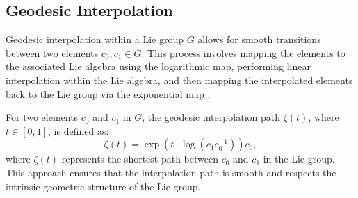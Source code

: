 \subsection{Geodesic Interpolation}
\label{subsec:geodesic-interpolation}

Geodesic interpolation within a Lie group \(G\) allows for smooth transitions between two elements \(c_0, c_1 \in G\). This process involves mapping the elements to the associated Lie algebra using the logarithmic map, performing linear interpolation within the Lie algebra, and then mapping the interpolated elements back to the Lie group via the exponential map \cite{shingelInterpolationSpecialOrthogonal2009, marthinsenInterpolationLieGroups1999}.

For two elements \(c_0\) and \(c_1\) in \(G\), the geodesic interpolation path \(\zeta(t)\), where \(t \in [0, 1]\), is defined as:
\begin{equation}
    \zeta(t) = \exp(t \cdot \log(c_1 c_0^{-1})) c_0,
    \label{eq:geodesic-interpolation}
\end{equation}
where \(\zeta(t)\) represents the shortest path between \(c_0\) and \(c_1\) in the Lie group. This approach ensures that the interpolation path is smooth and respects the intrinsic geometric structure of the Lie group.